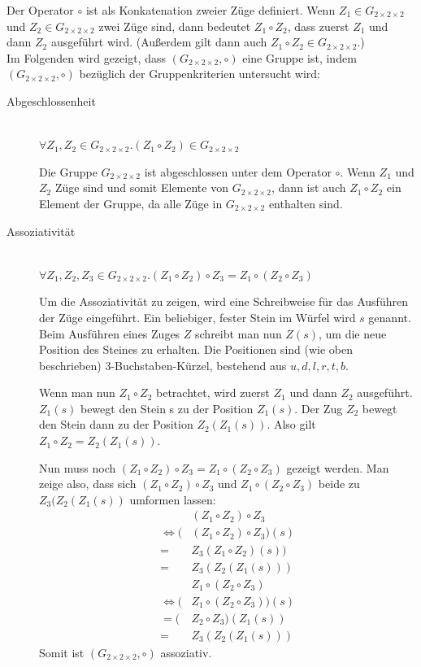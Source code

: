 \documentclass[12pt,a4paper, usenames, dvipsnames]{article}
\newcommand{\Gtwo}{\ensuremath{G_{2\times 2\times 2}}}
\begin{document}
Der Operator $\circ$ ist als Konkatenation zweier Züge definiert. Wenn $Z_1 \in \Gtwo$ und $Z_2 \in \Gtwo$ zwei Züge sind, dann bedeutet $Z_1 \circ Z_2$, dass zuerst $Z_1$ und dann $Z_2$ ausgeführt wird. (Außerdem gilt dann auch $Z_1 \circ Z_2 \in \Gtwo$.)
\\ 

Im Folgenden wird gezeigt, dass $(\Gtwo, \circ)$ eine Gruppe ist, indem $(\Gtwo, \circ)$ bezüglich der Gruppenkriterien untersucht wird:
\begin{description}
\item [Abgeschlossenheit] \ \\
$\forall Z_1,Z_2 \in \Gtwo .  (Z_1 \circ Z_2) \in \Gtwo $ 


Die Gruppe $\Gtwo$ ist abgeschlossen unter dem Operator $\circ$. Wenn $Z_1 $ und $Z_2$ Züge sind und somit Elemente von $\Gtwo$, dann ist auch $Z_1 \circ Z_2$ ein Element der Gruppe, da alle Züge in $\Gtwo$ enthalten sind. 



\item [Assoziativität] \ \\
$\forall Z_1,Z_2,Z_3 \in \Gtwo.(Z_1 \circ Z_2) \circ Z_3 = Z_1 \circ (Z_2 \circ Z_3)$ 


Um die Assoziativität zu zeigen, wird eine Schreibweise für das Ausführen der Züge eingeführt. Ein beliebiger, fester Stein im Würfel wird $s$ genannt. Beim Ausführen eines Zuges $Z$ schreibt man nun $Z(s)$, um die neue Position des Steines zu erhalten. Die Positionen sind (wie oben beschrieben) 3-Buchstaben-Kürzel, bestehend aus $u, d, l, r, t, b$. 

Wenn man nun $Z_1 \circ Z_2 $ betrachtet, wird zuerst $Z_1$ und dann $Z_2$ ausgeführt. $Z_1(s)$ bewegt den Stein s zu der Position $Z_1(s)$. Der Zug $Z_2$ bewegt den Stein dann zu der Position $Z_2(Z_1(s))$. Also gilt $Z_1 \circ Z_2 = Z_2(Z_1(s))$. 


Nun muss noch $(Z_1 \circ Z_2) \circ Z_3 = Z_1 \circ (Z_2 \circ Z_3)$ gezeigt werden. Man zeige also, dass sich $(Z_1 \circ Z_2) \circ Z_3$ und $Z_1 \circ (Z_2 \circ Z_3)$ beide zu $Z_3(Z_2(Z_1(s))$ umformen lassen: 
\begin{align*}
& (Z_1 \circ Z_2) \circ Z_3  \\
\Leftrightarrow (&(Z_1 \circ Z_2) \circ Z_3)(s) \\
= & Z_3(Z_1 \circ Z_2)(s)) \\
= & Z_3(Z_2(Z_1(s)))  
\end{align*}
\begin{align*}
&Z_1 \circ (Z_2 \circ Z_3) \\
\Leftrightarrow (&Z_1 \circ (Z_2 \circ Z_3))(s) \\
= (&Z_2 \circ Z_3)(Z_1(s)) \\
= \ \ & Z_3(Z_2(Z_1(s)))  
\end{align*}
Somit ist $(\Gtwo, \circ)$ assoziativ.


\end{description}
\end{document}

